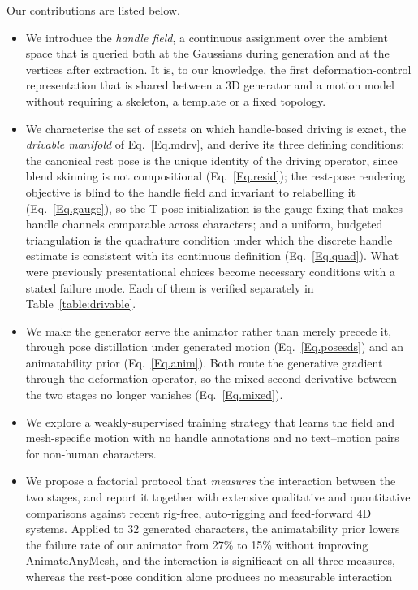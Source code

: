\documentclass[lettersize,journal]{IEEEtran}
\newcommand{\rev}[1]{{\color{red}#1}}
\begin{document}
Our contributions are listed below.
\begin{itemize}
\item We introduce the \textit{handle field}, a continuous assignment over the ambient space
that is queried both at the Gaussians during generation and at the vertices after extraction.
It is, to our knowledge, the first deformation-control representation that is shared between a
3D generator and a motion model without requiring a skeleton, a template or a fixed topology.
\item We characterise the set of assets on which handle-based driving is exact, the
\textit{drivable manifold} of Eq.~\ref{Eq.mdrv}, and derive its three defining conditions:
the canonical rest pose is the unique identity of the driving operator, since blend skinning
is not compositional (Eq.~\ref{Eq.resid}); the rest-pose rendering objective is blind to the
handle field and invariant to relabelling it (Eq.~\ref{Eq.gauge}), so the T-pose
initialization is the gauge fixing that makes handle channels comparable across characters;
and a uniform, budgeted triangulation is the quadrature condition under which the discrete
handle estimate is consistent with its continuous definition (Eq.~\ref{Eq.quad}). What were
previously presentational choices become necessary conditions with a stated failure mode.
\rev{Each of them is verified separately in Table~\ref{table:drivable}.}
\item We make the generator serve the animator rather than merely precede it, through pose
distillation under generated motion (Eq.~\ref{Eq.posesds}) and an animatability prior
(Eq.~\ref{Eq.anim}). Both route the generative gradient through the deformation operator, so
the mixed second derivative between the two stages no longer vanishes
(Eq.~\ref{Eq.mixed}).
\item We explore a weakly-supervised training strategy that learns the field and
mesh-specific motion with no handle annotations and no text--motion pairs for non-human
characters.
\item We propose a factorial protocol that \textit{measures} the interaction between the two
stages, and report it together with extensive qualitative and quantitative comparisons against
recent rig-free, auto-rigging and feed-forward 4D systems. \rev{Applied to 32 generated
characters, the animatability prior lowers the failure rate of our animator from 27\% to 15\%
without improving AnimateAnyMesh, and the interaction is significant on all three measures,
whereas the rest-pose condition alone produces no measurable interaction
}
\end{itemize}
\end{document}
